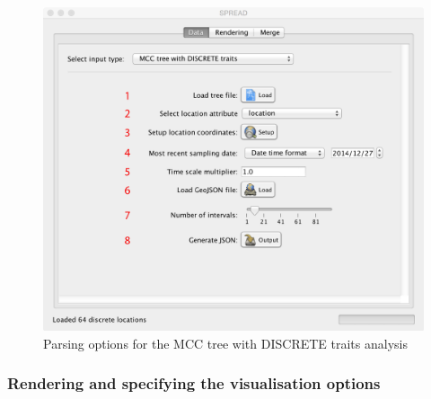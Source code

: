 \documentclass[english]{paper}
\begin{document}
\begin{figure}%
\centering
\includegraphics[width=1\textwidth]{./figures/Fig1_parsing_discrete.pdf} %
\caption{Parsing options for the MCC tree with DISCRETE traits analysis}
\label{fig:parseDiscrete}
\end{figure}

\subsubsection{Rendering and specifying the visualisation options}
\end{document}
